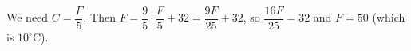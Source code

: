 We need $C=\dfrac {F}{5}$. Then $F=\dfrac{9}{5}\cdot\dfrac {F}{5}+32=\dfrac{9F}{25}+32$, so $\dfrac{16F}{25}=32$ and $F=\boxed{50}$ (which is $10^\circ$C).

